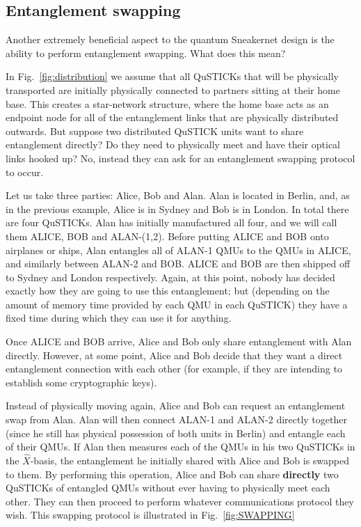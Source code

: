 \documentclass[twocolumn, aps, rmp, amsmath, amssymb, nofootinbib, superscriptaddress, longbibliography, floatfix, table-of-contents, eqsecnum]{revtex4-2}
\begin{document}
\subsection{Entanglement swapping}

Another extremely beneficial aspect to the quantum Sneakernet design is the ability to perform entanglement swapping. What does this mean? 

In Fig.~\ref{fig:distribution} we assume that all QuSTICKs that will be physically transported are initially physically connected to partners sitting at their home base. This creates a star-network structure, where the home base acts as an endpoint node for all of the entanglement links that are physically distributed outwards. But suppose two distributed QuSTICK units want to share entanglement directly? Do they need to physically meet and have their optical links hooked up? No, instead they can ask for an entanglement swapping protocol to occur. 

Let us take three parties: Alice, Bob and Alan. Alan is located in Berlin, and, as in the previous example, Alice is in Sydney and Bob is in London. In total there are four QuSTICKs. Alan has initially manufactured all four, and we will call them ALICE, BOB and ALAN-(1,2). Before putting ALICE and BOB onto airplanes or ships, Alan entangles all of ALAN-1 QMUs to the QMUs in ALICE, and similarly between ALAN-2 and BOB. ALICE and BOB are then shipped off to Sydney and London respectively. Again, at this point, nobody has decided exactly how they are going to use this entanglement; but (depending on the amount of memory time provided by each QMU in each QuSTICK) they have a fixed time during which they can use it for anything. 

Once ALICE and BOB arrive, Alice and Bob only share entanglement with Alan directly. However, at some point, Alice and Bob decide that they want a direct entanglement connection with each other (for example, if they are intending to establish some cryptographic keys).

Instead of physically moving again, Alice and Bob can request an entanglement swap from Alan. Alan will then connect ALAN-1 and ALAN-2 directly together (since he still has physical possession of both units in Berlin) and entangle each of their QMUs. If Alan then measures each of the QMUs in his two QuSTICKs in the $\hat{X}$-basis, the entanglement he initially shared with Alice and Bob is swapped to them. By performing this operation, Alice and Bob can share \textbf{directly} two QuSTICKs of entangled QMUs without ever having to physically meet each other. They can then proceed to perform whatever communications protocol they wish. This swapping protocol is illustrated in Fig.~\ref{fig:SWAPPING} 
\end{document}
